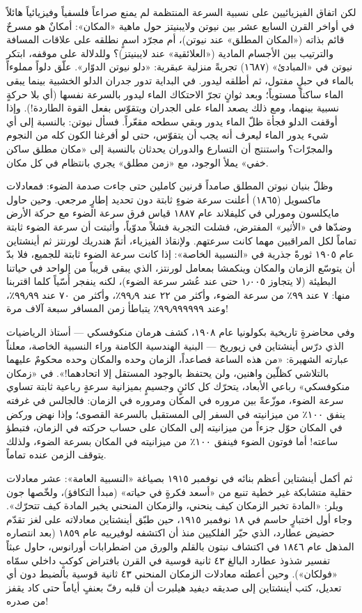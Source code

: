 \documentclass[12pt,a4paper,openany]{book}
\begin{document}
لكن اتفاق الفيزيائيين على نسبية السرعة المنتظمة لم يمنع صراعاً فلسفياً وفيزيائياً هائلاً في أواخر القرن السابع عشر بين نيوتن ولايبنيتز حول ماهية «المكان»: أمكانٌ هو مسرحٌ قائم بذاته («المكان المطلق» عند نيوتن)، أم مجرّد اسمٍ نطلقه على علاقات المسافة والترتيب بين الأجسام المادية («العلائقية» عند لايبنيتز)؟ وللدلالة على موقفه، ابتكر نيوتن في «المبادئ» (١٦٨٧) تجربةً منزلية عبقرية: «دلو نيوتن الدوّار». علّق دلواً مملوءاً بالماء في حبلٍ مفتول، ثم أطلقه ليدور. في البداية تدور جدران الدلو الخشبية بينما يبقى الماء ساكناً مستوياً؛ وبعد ثوانٍ تجرّ الاحتكاك الماء ليدور بالسرعة نفسها (أي بلا حركةٍ نسبية بينهما، ومع ذلك يصعد الماء على الجدران ويتقوّس بفعل القوة الطاردة!). وإذا أوقفت الدلو فجأة ظلّ الماء يدور وبقي سطحه مقعّراً. فسأل نيوتن: بالنسبة إلى أي شيء يدور الماء ليعرف أنه يجب أن يتقوّس، حتى لو أفرغنا الكون كله من النجوم والمجرّات؟ واستنتج أن التسارع والدوران يحدثان بالنسبة إلى «مكان مطلق ساكن خفي» يملأ الوجود، مع «زمن مطلق» يجري بانتظام في كل مكان.


وظلّ بنيان نيوتن المطلق صامداً قرنين كاملين حتى جاءت صدمة الضوء: فمعادلات ماكسويل (١٨٦٥) أعلنت سرعة ضوءٍ ثابتة دون تحديد إطارٍ مرجعي. وحين حاول مايكلسون ومورلي في كليفلاند عام ١٨٨٧ قياس فرق سرعة الضوء مع حركة الأرض وضدّها في «الأثير» المفترض، فشلت التجربة فشلاً مدوّياً، وأثبتت أن سرعة الضوء ثابتة تماماً لكل المراقبين مهما كانت سرعتهم. ولإنقاذ الفيزياء، أتمّ هندريك لورنتز ثم أينشتاين عام ١٩٠٥ ثورةً جذرية في «النسبية الخاصة»: إذا كانت سرعة الضوء ثابتة للجميع، فلا بدّ أن يتوسّع الزمان والمكان وينكمشا بمعامل لورنتز، الذي يبقى قريباً من الواحد في حياتنا البطيئة (لا يتجاوز ١٫٠٠٥ حتى عند عُشر سرعة الضوء)، لكنه ينفجر أُسّياً كلما اقتربنا منها: ٧ عند ٩٩٪ من سرعة الضوء، وأكثر من ٢٢ عند ٩٩٫٩٪، وأكثر من ٧٠ عند ٩٩٫٩٩٪، وعند ٩٩٫٩٩٩٩٩٩٪ يتباطأ زمن المسافر سبعة آلاف مرة!


وفي محاضرةٍ تاريخية بكولونيا عام ١٩٠٨، كشف هرمان منكوفسكي — أستاذ الرياضيات الذي درّس أينشتاين في زيوريخ — البنية الهندسية الكامنة وراء النسبية الخاصة، معلناً عبارته الشهيرة: «من هذه الساعة فصاعداً، الزمان وحده والمكان وحده محكومٌ عليهما بالتلاشي كظلّين واهنين، ولن يحتفظ بالوجود المستقل إلا اتحادهما!». في «زمكان منكوفسكي» رباعي الأبعاد، يتحرّك كل كائنٍ وجسيمٍ بميزانية سرعةٍ رباعية ثابتة تساوي سرعة الضوء، موزّعةً بين مروره في المكان ومروره في الزمان: فالجالس في غرفته ينفق ١٠٠٪ من ميزانيته في السفر إلى المستقبل بالسرعة القصوى؛ وإذا نهض وركض في المكان حوّل جزءاً من ميزانيته إلى المكان على حساب حركته في الزمان، فتبطؤ ساعته! أما فوتون الضوء فينفق ١٠٠٪ من ميزانيته في المكان بسرعة الضوء، ولذلك يتوقف الزمن عنده تماماً.


ثم أكمل أينشتاين أعظم بنائه في نوفمبر ١٩١٥ بصياغة «النسبية العامة»: عشر معادلات حقلية متشابكة غير خطية تنبع من «أسعد فكرةٍ في حياته» (مبدأ التكافؤ)، ولخّصها جون ويلر: «المادة تخبر الزمكان كيف ينحني، والزمكان المنحني يخبر المادة كيف تتحرّك». وجاء أول اختبارٍ حاسم في ١٨ نوفمبر ١٩١٥، حين طبّق أينشتاين معادلاته على لغز تقدّم حضيض عطارد، الذي حيّر الفلكيين منذ أن اكتشفه لوفيرييه عام ١٨٥٩ (بعد انتصاره المذهل عام ١٨٤٦ في اكتشاف نبتون بالقلم والورق من اضطرابات أورانوس، حاول عبثاً تفسير شذوذ عطارد البالغ ٤٣ ثانية قوسية في القرن بافتراض كوكبٍ داخلي سمّاه «فولكان»). وحين أعطته معادلات الزمكان المنحني ٤٣ ثانية قوسية بالضبط دون أي تعديل، كتب أينشتاين إلى صديقه ديفيد هيلبرت أن قلبه رفّ بعنفٍ أياماً حتى كاد يقفز من صدره!
\end{document}
